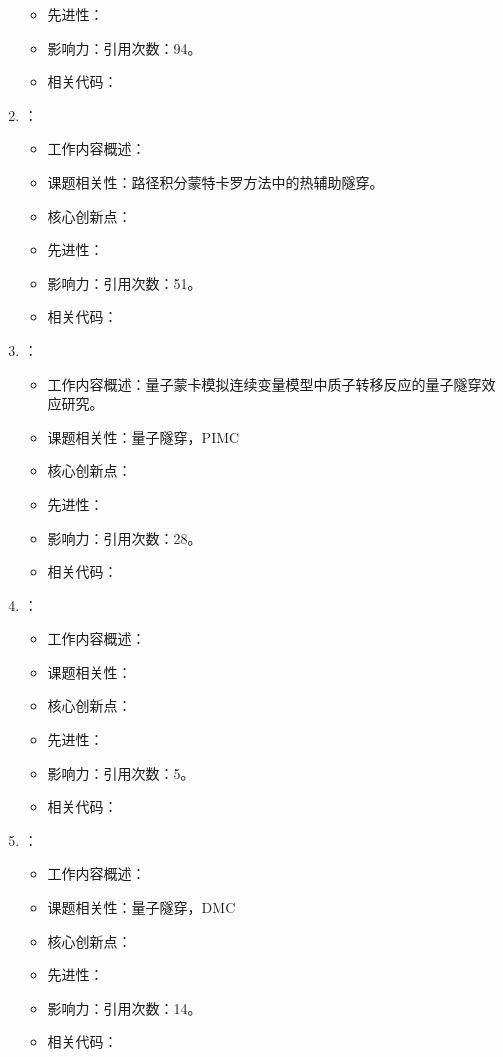 \begin{enumerate}
\begin{itemize}
                \item 先进性：
                \item 影响力：引用次数：94。
                \item 相关代码：
            \end{itemize}
            \item \citet{jiang2017scaling}：
            \begin{itemize}
                \item 工作内容概述：
                \item 课题相关性：路径积分蒙特卡罗方法中的热辅助隧穿。
                \item 核心创新点：
                \item 先进性：
                \item 影响力：引用次数：51。
                \item 相关代码：
            \end{itemize}
            \item \citet{mazzola2017quantum}：
            \begin{itemize}
                \item 工作内容概述：量子蒙卡模拟连续变量模型中质子转移反应的量子隧穿效应研究。
                \item 课题相关性：量子隧穿，PIMC
                \item 核心创新点：
                \item 先进性：
                \item 影响力：引用次数：28。
                \item 相关代码：
            \end{itemize}
            \item \citet{pollet2018stochastic}：
            \begin{itemize}
                \item 工作内容概述：
                \item 课题相关性：
                \item 核心创新点：
                \item 先进性：
                \item 影响力：引用次数：5。
                \item 相关代码：
            \end{itemize}
            \item \citet{inack2018understanding}：
            \begin{itemize}
                \item 工作内容概述：
                \item 课题相关性：量子隧穿，DMC
                \item 核心创新点：
                \item 先进性：
                \item 影响力：引用次数：14。
                \item 相关代码：
            \end{itemize}

    \end{enumerate}
    
